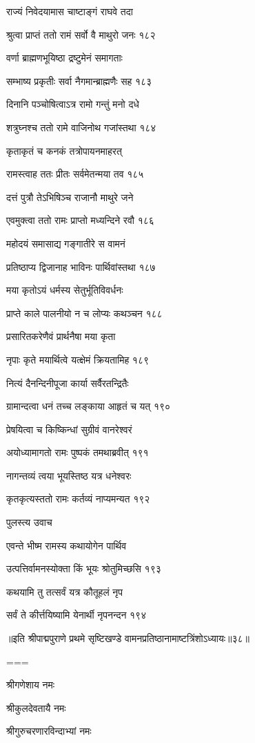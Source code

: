 राज्यं निवेदयामास चाष्टाङ्गं राघवे तदा

श्रुत्वा प्राप्तं ततो रामं सर्वो वै माथुरो जनः १८२

वर्णा ब्राह्मणभूयिष्ठा द्रष्टुमेनं समागताः

सम्भाष्य प्रकृतीः सर्वा नैगमान्ब्राह्मणैः सह १८३

दिनानि पञ्चोषित्वाऽत्र रामो गन्तुं मनो दधे

शत्रुघ्नश्च ततो रामे वाजिनोथ गजांस्तथा १८४

कृताकृतं च कनकं तत्रोपायनमाहरत्

रामस्त्वाह ततः प्रीतः सर्वमेतन्मया तव १८५

दत्तं पुत्रौ तेऽभिषिञ्च राजानौ माथुरे जने

एवमुक्त्वा ततो रामः प्राप्तो मध्यन्दिने रवौ १८६

महोदयं समासाद्य गङ्गातीरे स वामनं

प्रतिष्ठाप्य द्विजानाह भाविनः पार्थिवांस्तथा १८७

मया कृतोऽयं धर्मस्य सेतुर्भूतिविवर्धनः

प्राप्ते काले पालनीयो न च लोप्यः कथञ्चन १८८

प्रसारितकरेणैवं प्रार्थनैषा मया कृता

नृपाः कृते मयार्थित्वे यत्क्षेमं क्रियतामिह १८९

नित्यं दैनन्दिनीपूजा कार्या सर्वैरतन्द्रितैः

ग्रामान्दत्वा धनं तच्च लङ्काया आहृतं च यत् १९०

प्रेषयित्वा च किष्किन्धां सुग्रीवं वानरेश्वरं

अयोध्यामागतो रामः पुष्पकं तमथाब्रवीत् १९१

नागन्तव्यं त्वया भूयस्तिष्ठ यत्र धनेश्वरः

कृतकृत्यस्ततो रामः कर्तव्यं नाप्यमन्यत १९२

पुलस्त्य उवाच

एवन्ते भीष्म रामस्य कथायोगेन पार्थिव

उत्पत्तिर्वामनस्योक्ता किं भूयः श्रोतुमिच्छसि १९३

कथयामि तु तत्सर्वं यत्र कौतूहलं नृप

सर्वं ते कीर्त्तयिष्यामि येनार्थी नृपनन्दन १९४

॥इति श्रीपाद्मपुराणे प्रथमे सृष्टिखण्डे वामनप्रतिष्ठानामाष्टत्रिंशोऽध्यायः॥३८॥


===



श्रीगणेशाय नमः

श्रीकुलदेवतायै नमः

श्रीगुरुचरणारविन्दाभ्यां नमः

